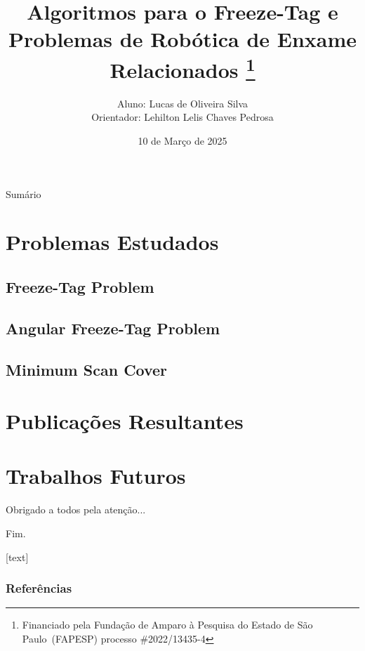 \documentclass[xcolor=table]{beamer}
\title{
  Algoritmos para o Freeze-Tag e Problemas de Robótica de Enxame Relacionados%
  \texorpdfstring{\footnote{Financiado pela Fundação de Amparo à Pesquisa do
  Estado de São Paulo~(FAPESP) processo \mbox{\#2022/13435-4}}}{}
}
\author{
  Aluno: Lucas de Oliveira Silva\texorpdfstring{\\}{}
  Orientador: Lehilton Lelis Chaves Pedrosa
}
\institute{Instituto de Computação, Unicamp}
\date{10 de Março de 2025}
\begin{document}
\begin{frame}[plain]
  \titlepage
\end{frame}

\setcounter{tocdepth}{2}
\begin{frame}{Sumário}
  \tableofcontents
\end{frame}


\section{Problemas Estudados}

\subsection{Freeze-Tag Problem}


\subsection{Angular Freeze-Tag Problem}


\subsection{Minimum Scan Cover}


\section{Publicações Resultantes}


\section{Trabalhos Futuros}


\begin{frame}
  \large{\centerline{Obrigado a todos pela atenção...}}
  \pause
  \Huge{\centerline{Fim.}}
\end{frame}


\appendix

[text]
\begin{frame}[allowframebreaks]
  \frametitle{Referências}
  {
    \tiny
    
    
  }
\end{frame}

\end{document}

